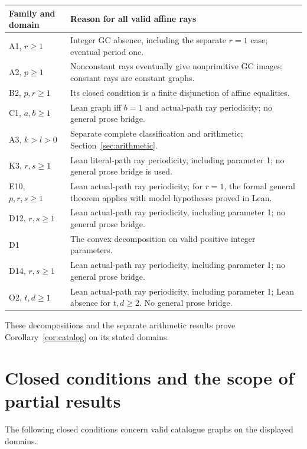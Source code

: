 \documentclass[11pt]{amsart}
\theoremstyle{definition}\newtheorem{definition}{Definition}
\begin{document}
\begin{center}\small
\begin{tabular}{p{}p{}}\toprule
Family and domain & Reason for all valid affine rays\\\midrule
A1, $r\ge1$ & Integer GC absence, including the separate $r=1$ case; eventual period one.\\
A2, $p\ge1$ & Nonconstant rays eventually give nonprimitive GC images; constant rays are constant graphs.\\
B2, $p,r\ge1$ & Its closed condition is a finite disjunction of affine equalities.\\
C1, $a,b\ge1$ & Lean graph iff $b=1$ and actual-path ray periodicity; no general prose bridge.\\
A3, $k>l>0$ & Separate complete classification and arithmetic; Section~\ref{sec:arithmetic}.\\
K3, $r,s\ge1$ & Lean literal-path ray periodicity, including parameter 1; no general prose bridge is used.\\
E10, $p,r,s\ge1$ & Lean actual-path ray periodicity; for $r=1$, the formal general theorem applies with model hypotheses proved in Lean.\\
D12, $r,s\ge1$ & Lean actual-path ray periodicity, including parameter 1; no general prose bridge.\\
D1 & The convex decomposition on valid positive integer parameters.\\
D14, $r,s\ge1$ & Lean actual-path ray periodicity, including parameter 1; no general prose bridge.\\
O2, $t,d\ge1$ & Lean actual-path ray periodicity, including parameter 1; Lean absence for $t,d\ge2$. No general prose bridge.\\\bottomrule
\end{tabular}
\end{center}
These decompositions and the separate arithmetic results prove
Corollary~\ref{cor:catalog} on its stated domains.

\section{Closed conditions and the scope of partial results}\label{sec:conditions}
The following closed conditions concern valid catalogue graphs on
the displayed domains.
\end{document}
